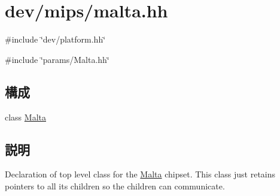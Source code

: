 \hypertarget{malta_8hh}{
\section{dev/mips/malta.hh}
\label{malta_8hh}
}
{\ttfamily \#include \char`\"{}dev/platform.hh\char`\"{}}\par
{\ttfamily \#include \char`\"{}params/Malta.hh\char`\"{}}\par
\subsection*{構成}
\begin{DoxyCompactItemize}
\item 
class \hyperlink{classMalta}{Malta}
\end{DoxyCompactItemize}


\subsection{説明}
Declaration of top level class for the \hyperlink{classMalta}{Malta} chipset. This class just retains pointers to all its children so the children can communicate. 